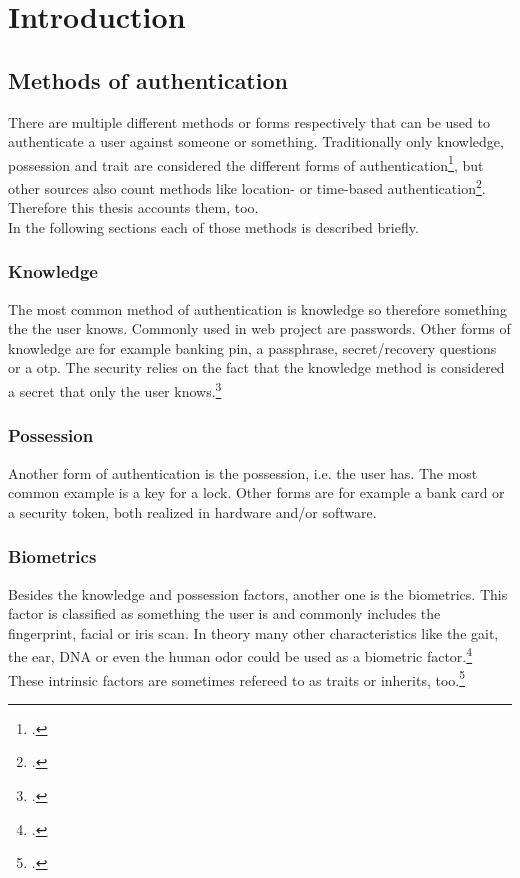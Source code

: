 \chapter{Introduction}

\blindtext

\section{Methods of authentication}

There are multiple different methods or forms  respectively that can be used to authenticate a user against someone or something. Traditionally only knowledge, possession and trait are considered the different forms of authentication\footcite[See][140]{brotherston2017defensive}, but other sources also count methods like location- or time-based authentication\footcite{6296127}.  Therefore this thesis accounts them, too.\\
In the following sections each of those methods is described briefly.

\subsection{Knowledge}

The most common method of authentication is knowledge so therefore something the \frqq the user knows\flqq{}. Commonly used in web project are passwords. Other forms of knowledge are for example banking \gls{pin}, a passphrase, secret/recovery questions or a \gls{otp}. The security relies on the fact that the knowledge method is considered a secret that only the user knows.\footcite[See][467]{eckert-it-sec-9}

\subsection{Possession}

Another form of authentication is the possession, i.e. \frqq the user has\flqq{}. The most common example is a key for a lock. Other forms are for example a bank card or a security token, both realized in hardware and/or software.

\subsection{Biometrics}

Besides the knowledge and possession factors, another one is the biometrics. This factor is classified as something \frqq the user is\flqq{} and commonly includes the fingerprint, facial or iris scan. In theory many other characteristics like the gait, the ear, DNA or even the human odor could be used as a biometric factor.\footcite[See][30--34]{Jain2011}\\
These intrinsic factors are sometimes refereed to as traits or inherits, too.\footcite[See][186]{dasgupta2017multi}

